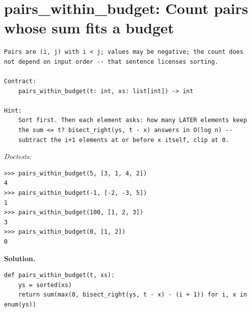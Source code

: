 \documentclass[11pt,letterpaper]{book}
\begin{document}
\section{pairs\_within\_budget: Count pairs whose sum fits a budget}
\begin{lstlisting}[style=spec]
Pairs are (i, j) with i < j; values may be negative; the count does
not depend on input order -- that sentence licenses sorting.

Contract:
    pairs_within_budget(t: int, xs: list[int]) -> int

Hint:
    Sort first. Then each element asks: how many LATER elements keep
    the sum <= t? bisect_right(ys, t - x) answers in O(log n) --
    subtract the i+1 elements at or before x itself, clip at 0.
\end{lstlisting}
\noindent\textit{Doctests:}
\begin{lstlisting}[style=spec]
>>> pairs_within_budget(5, [3, 1, 4, 2])
4
>>> pairs_within_budget(-1, [-2, -3, 5])
1
>>> pairs_within_budget(100, [1, 2, 3])
3
>>> pairs_within_budget(0, [1, 2])
0
\end{lstlisting}
\noindent\textbf{Solution.}
\begin{lstlisting}[style=code]
def pairs_within_budget(t, xs):
    ys = sorted(xs)
    return sum(max(0, bisect_right(ys, t - x) - (i + 1)) for i, x in enum(ys))
\end{lstlisting}
\end{document}

